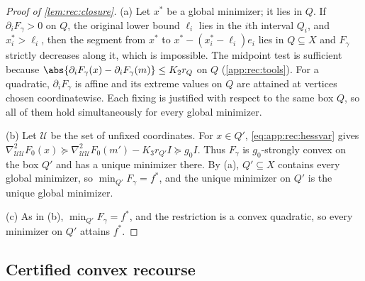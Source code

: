 \begin{proof}[Proof of \cref{lem:rec:closure}]
(a) Let $x^*$ be a global minimizer; it lies in $Q$. If $\partial_iF_\gamma>0$
on $Q$, the original lower bound $\ell_i$ lies in the $i$th interval $Q_i$,
and $x^*_i>\ell_i$, then the segment from $x^*$ to
$x^*-(x^*_i-\ell_i)e_i$ lies in $Q\subseteq X$ and $F_\gamma$ strictly
decreases along it, which is impossible. The midpoint test is sufficient
because $\abs{\partial_iF_\gamma(x)-\partial_iF_\gamma(m)}\le K_2r_Q$ on $Q$
(\cref{app:rec:tools}). For a quadratic, $\partial_iF_\gamma$ is affine and
its extreme values on $Q$ are attained at vertices chosen coordinatewise.
Each fixing is justified with respect to the same box $Q$, so all of them
hold simultaneously for every global minimizer.

(b) Let $\mathcal U$ be the set of unfixed coordinates. For $x\in Q'$,
\eqref{eq:app:rec:hessvar} gives
$\nabla^2_{\mathcal U\mathcal U}F_0(x)\succeq\nabla^2_{\mathcal U\mathcal U}
F_0(m')-K_3r_{Q'}I\succeq g_0I$. Thus $F_\gamma$ is $g_0$-strongly convex on
the box $Q'$ and has a unique minimizer there. By (a), $Q'\subseteq X$
contains every global minimizer, so $\min_{Q'}F_\gamma=f^*$, and the unique
minimizer on $Q'$ is the unique global minimizer.

(c) As in (b), $\min_{Q'}F_\gamma=f^*$, and the restriction is a convex
quadratic, so every minimizer on $Q'$ attains $f^*$.
\end{proof}

\subsection{Certified convex recourse}\label{app:rec:convex}

